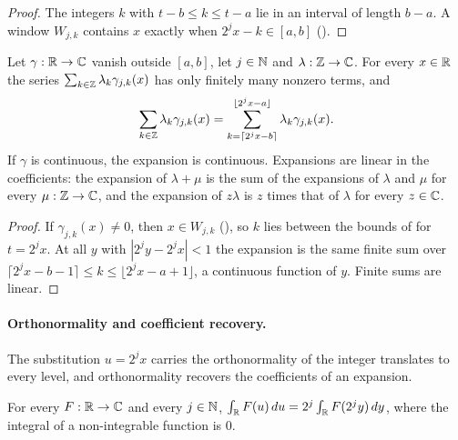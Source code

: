 \begin{proof}
\leanok
{}
The integers $k$ with $t - b \leq k \leq t - a$ lie in an interval of length $b - a$. A window
$W_{j,k}$ contains $x$ exactly when $2^j x - k \in [a, b]$ ().
\end{proof}

\begin{lemma}
\label{lem:daub-expand-finite}
\leanok
{}
Let $\gamma : \mathbb{R} \to \mathbb{C}$ vanish outside $[a, b]$, let $j \in \mathbb{N}$ and $\lambda : \mathbb{Z} \to \mathbb{C}$. For
every $x \in \mathbb{R}$ the series $\sum_{k \in \mathbb{Z}} \lambda_k \gamma_{j,k}(x)$ has only finitely many
nonzero terms, and
\[
  \sum_{k \in \mathbb{Z}} \lambda_k \gamma_{j,k}(x)
  = \sum_{k = \lceil 2^j x - b \rceil}^{\lfloor 2^j x - a \rfloor} \lambda_k \gamma_{j,k}(x) .
\]
If $\gamma$ is continuous, the expansion is continuous. Expansions are linear in the
coefficients: the expansion of $\lambda + \mu$ is the sum of the expansions of $\lambda$ and
$\mu$ for every $\mu : \mathbb{Z} \to \mathbb{C}$, and the expansion of $z \lambda$ is $z$ times that of
$\lambda$ for every $z \in \mathbb{C}$.
\end{lemma}

\begin{proof}
\leanok
{}
If $\gamma_{j,k}(x) \neq 0$, then $x \in W_{j,k}$ (), so $k$ lies
between the bounds of  for $t = 2^j x$. At all $y$ with
$|2^j y - 2^j x| < 1$ the expansion is the same finite sum over
$\lceil 2^j x - b - 1 \rceil \leq k \leq \lfloor 2^j x - a + 1 \rfloor$, a continuous function of
$y$. Finite sums are linear.
\end{proof}

\paragraph{Orthonormality and coefficient recovery.}
The substitution $u = 2^j x$ carries the orthonormality of the integer translates to every level,
and orthonormality recovers the coefficients of an expansion.

\begin{lemma}
\label{lem:daub-dyadic-substitution}
\leanok
For every $F : \mathbb{R} \to \mathbb{C}$ and every $j \in \mathbb{N}$,
$\int_{\mathbb{R}} F(u) \, du = 2^j \int_{\mathbb{R}} F(2^j y) \, dy$, where the integral of a non-integrable
function is $0$.
\end{lemma}

